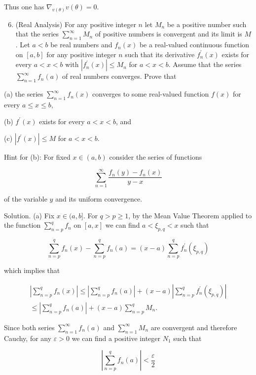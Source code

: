 \documentclass[10pt]{article}
\begin{document}
Thus one has $\nabla_{v(\theta)} v(\theta)=0$.

\begin{enumerate}
  \setcounter{enumi}{5}
  \item (Real Analysis) For any positive integer $n$ let $M_{n}$ be a positive number such that the series $\sum_{n=1}^{\infty} M_{n}$ of positive numbers is convergent and its limit is $M$. Let $a<b$ be real numbers and $f_{n}(x)$ be a real-valued continuous function on $[a, b]$ for any positive integer $n$ such that its derivative $f_{n}^{\prime}(x)$ exists for every $a<x<b$ with $\left|f_{n}^{\prime}(x)\right| \leq M_{n}$ for $a<x<b$. Assume that the series $\sum_{n=1}^{\infty} f_{n}(a)$ of real numbers converges. Prove that
\end{enumerate}

(a) the series $\sum_{n=1}^{\infty} f_{n}(x)$ converges to some real-valued function $f(x)$ for every $a \leq x \leq b$,

(b) $f^{\prime}(x)$ exists for every $a<x<b$, and

(c) $\left|f^{\prime}(x)\right| \leq M$ for $a<x<b$.

Hint for (b): For fixed $x \in(a, b)$ consider the series of functions

$$
\sum_{n=1}^{\infty} \frac{f_{n}(y)-f_{n}(x)}{y-x}
$$

of the variable $y$ and its uniform convergence.

Solution. (a) Fix $x \in(a, b]$. For $q>p \geq 1$, by the Mean Value Theorem applied to the function $\sum_{n=p}^{q} f_{n}$ on $[a, x]$ we can find $a<\xi_{p, q}<x$ such that

$$
\sum_{n=p}^{q} f_{n}(x)-\sum_{n=p}^{q} f_{n}(a)=(x-a) \sum_{n=p}^{q} f_{n}^{\prime}\left(\xi_{p, q}\right)
$$

which implies that

$$
\begin{gathered}
\left|\sum_{n=p}^{q} f_{n}(x)\right| \leq\left|\sum_{n=p}^{q} f_{n}(a)\right|+(x-a)\left|\sum_{n=p}^{q} f_{n}^{\prime}\left(\xi_{p, q}\right)\right| \\
\leq\left|\sum_{n=p}^{q} f_{n}(a)\right|+(x-a) \sum_{n=p}^{q} M_{n} .
\end{gathered}
$$

Since both series $\sum_{n=1}^{\infty} f_{n}(a)$ and $\sum_{n=1}^{\infty} M_{n}$ are convergent and therefore Cauchy, for any $\varepsilon>0$ we can find a positive integer $N_{1}$ such that

$$
\left|\sum_{n=p}^{q} f_{n}(a)\right|<\frac{\varepsilon}{2}
$$
\end{document}
